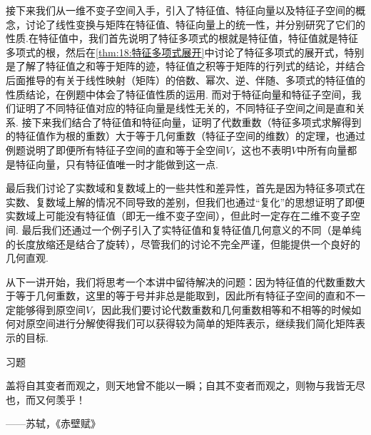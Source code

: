 接下来我们从一维不变子空间入手，引入了特征值、特征向量以及特征子空间的概念，讨论了线性变换与矩阵在特征值、特征向量上的统一性，并分别研究了它们的性质.在特征值中，我们首先说明了特征多项式的根就是特征值，特征值就是特征多项式的根，然后在\autoref{thm:18:特征多项式展开}中讨论了特征多项式的展开式，特别是了解了特征值之和等于矩阵的迹，特征值之积等于矩阵的行列式的结论，并结合后面推导的有关于线性映射（矩阵）的倍数、幂次、逆、伴随、多项式的特征值的性质结论，在例题中体会了特征值性质的运用. 而对于特征向量和特征子空间，我们证明了不同特征值对应的特征向量是线性无关的，不同特征子空间之间是直和关系. 接下来我们结合了特征值和特征向量，证明了代数重数（特征多项式求解得到的特征值作为根的重数）大于等于几何重数（特征子空间的维数）的定理，也通过例题说明了即便所有特征子空间的直和等于全空间$V$，这也不表明$V$中所有向量都是特征向量，只有特征值唯一时才能做到这一点.

最后我们讨论了实数域和复数域上的一些共性和差异性，首先是因为特征多项式在实数、复数域上解的情况不同导致的差别，但我们也通过``复化''的思想证明了即便实数域上可能没有特征值（即无一维不变子空间），但此时一定存在二维不变子空间. 最后我们还通过一个例子引入了实特征值和复特征值几何意义的不同（是单纯的长度放缩还是结合了旋转），尽管我们的讨论不完全严谨，但能提供一个良好的几何直观.

从下一讲开始，我们将思考一个本讲中留待解决的问题：因为特征值的代数重数大于等于几何重数，这里的等于号并非总是能取到，因此所有特征子空间的直和不一定能够得到原空间$V$，因此我们要讨论代数重数和几何重数相等和不相等的时候如何对原空间进行分解使得我们可以获得较为简单的矩阵表示，继续我们简化矩阵表示的目标.

\vspace{2ex}
\centerline{\heiti \Large 习题}

\vspace{2ex}
{\kaishu 盖将自其变者而观之，则天地曾不能以一瞬；自其不变者而观之，则物与我皆无尽也，而又何羡乎！}
\begin{flushright}
    \kaishu
    ——苏轼，《赤壁赋》
\end{flushright}

